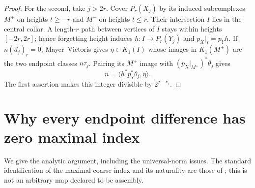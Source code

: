 \documentclass[11pt]{article}
\theoremstyle{remark}\newtheorem{remark}[theorem]{Remark}
\begin{document}
\begin{proof}
For the second, take $j>2r$. Cover $P_r(X_j)$ by its induced subcomplexes
$M^+$ on heights $t\geq-r$ and $M^-$ on heights $t\leq r$.
Their intersection $I$ lies in the central collar. A length-$r$ path
between vertices of $I$ stays within heights $[-2r,2r]$; hence forgetting
height induces $h:I\to P_r(Y_j)$ and $p_X|_I=p_Yh$.
If $n(d_j)_r=0$, Mayer--Vietoris gives $\eta\in K_1(I)$ whose images in
$K_1(M^\pm)$ are the two endpoint classes $n\tau_j$.
Pairing its $M^+$ image with $(p_X|_{M^+})^*\theta_j$ gives
\[
 n=\langle h^*p_Y^*\theta_j,\eta\rangle.
\]
The first assertion makes this integer divisible by $2^{j-c_r}$.
\end{proof}

\section{Why every endpoint difference has zero maximal index}

We give the analytic argument, including the universal-norm issues.
The standard identification of the maximal coarse index and its naturality
are those of \cite{OOY,SS}; this is not an arbitrary map declared to be
assembly.
\end{document}

